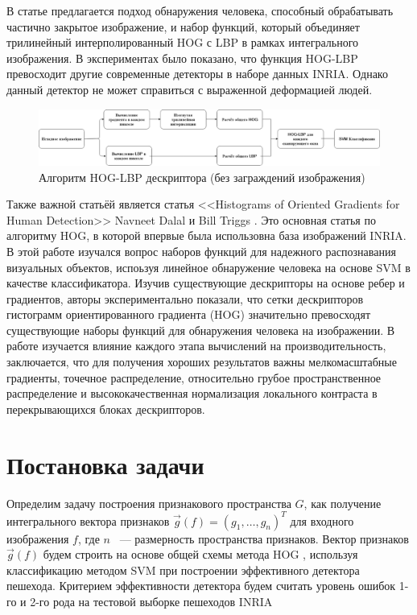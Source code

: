 \documentclass[12pt,twoside]{article}
\begin{document}
В статье предлагается подход обнаружения человека, способный обрабатывать частично закрытое изображение, и набор функций, который объединяет трилинейный интерполированный HOG с LBP в рамках интегрального изображения. В экспериментах было показано, что функция HOG-LBP превосходит другие современные детекторы в наборе данных INRIA. Однако данный детектор не может справиться с выраженной деформацией людей.

\begin{figure}[H]
	\includegraphics[width=1\textwidth]{Graph}
	\caption{Алгоритм HOG-LBP дескриптора (без заграждений изображения)\cite{Wang09} }
	\label{fg:Wang1}
\end{figure}

Также важной статьёй является статья <<Histograms of Oriented Gradients for Human Detection>> Navneet Dalal и Bill Triggs \cite{dalaltriggs2005}. Это основная статья по алгоритму HOG, в которой впервые была использовна база изображений INRIA. В этой работе изучался вопрос наборов функций для надежного распознавания визуальных объектов, испоьзуя линейное обнаружение человека на основе SVM в качестве классификатора. Изучив существующие дескрипторы на основе ребер и градиентов, авторы экспериментально показали, что сетки дескрипторов гистограмм ориентированного градиента (HOG) значительно превосходят существующие наборы функций для обнаружения человека на изображении. В работе изучается влияние каждого этапа вычислений на производительность, заключается, что для получения хороших результатов важны мелкомасштабные градиенты, точечное распределение, относительно грубое пространственное распределение и высококачественная нормализация локального контраста в перекрывающихся блоках дескрипторов.

\section{Постановка задачи}
Определим задачу построения признакового пространства $G$, как получение интегрального вектора признаков $\vec{g}(f) = (g_{1},\dots , g_{n})^{T}$ для входного изображения $f$, где $n$ ~--- размерность пространства признаков. Вектор признаков $\vec{g}(f)$ будем строить на основе общей схемы метода HOG \cite{dalaltriggs2005}, используя классификацию методом SVM при построении эффективного детектора пешехода. Критерием эффективности детектора будем считать уровень ошибок 1-го и 2-го рода на тестовой выборке пешеходов INRIA 
\end{document}
